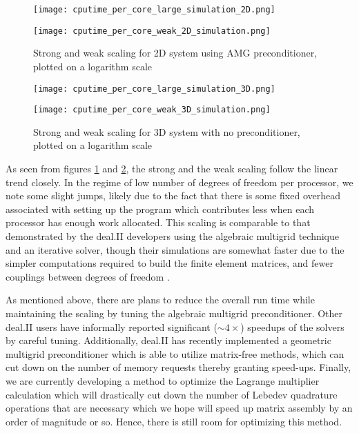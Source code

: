 \documentclass[reqno]{article}
\begin{document}
\begin{figure}[h]
  \centering 
  \begin{minipage}{0.49\textwidth}
    \centering
    \texttt{[image: cputime\_per\_core\_large\_simulation\_2D.png]}
  \end{minipage}
  \begin{minipage}{0.49\textwidth}
    \centering
    \texttt{[image: cputime\_per\_core\_weak\_2D\_simulation.png]}
  \end{minipage}
  \caption{Strong and weak scaling for 2D system using AMG preconditioner,
    plotted on a logarithm scale}
  \label{fig-scaling-2D}
\end{figure}
\begin{figure}[h]
  \centering 
  \begin{minipage}{0.49\textwidth}
    \centering
    \texttt{[image: cputime\_per\_core\_large\_simulation\_3D.png]}
  \end{minipage}
  \begin{minipage}{0.49\textwidth}
    \centering
    \texttt{[image: cputime\_per\_core\_weak\_3D\_simulation.png]}
  \end{minipage}
  \caption{Strong and weak scaling for 3D system with no preconditioner,
    plotted on a logarithm scale}
  \label{fig-scaling-3D}
\end{figure}

As seen from figures \ref{fig-scaling-2D} and \ref{fig-scaling-3D}, the strong and the weak scaling follow the linear trend closely.
In the regime of low number of degrees of freedom per processor, we note some
slight jumps, likely due to the fact that there is some fixed overhead
associated with setting up the program which contributes less when each
processor has enough work allocated.
This scaling is comparable to that demonstrated by the deal.II developers using
the algebraic multigrid technique and an iterative solver, though their
simulations are somewhat faster due to the simpler
computations required to build the finite element matrices, and fewer couplings
between degrees of freedom \cite{bangerth_algorithms_2011}.

As mentioned above, there are plans to reduce the overall run time while
maintaining the scaling by tuning the algebraic multigrid preconditioner.
Other deal.II users have informally reported significant ($\sim4\times$) speedups of
the solvers by careful tuning.
Additionally, deal.II has recently implemented a geometric multigrid
preconditioner which is able to utilize matrix-free methods, which can cut down
on the number of memory requests thereby granting speed-ups.
Finally, we are currently developing a method to optimize the Lagrange
multiplier calculation which will drastically cut down the number of Lebedev
quadrature operations that are necessary which we hope will speed up matrix
assembly by an order of magnitude or so.
Hence, there is still room for optimizing this method.

{}

% 
% 
% 
\end{document}

